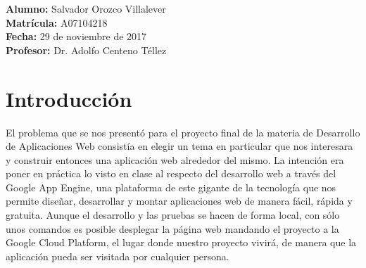 \documentclass[12pt]{article}
\begin{document}
\begin{titlepage}
    
    
    \textbf{Alumno:} Salvador Orozco Villalever\\
    \textbf{Matrícula:} A07104218\\
    \textbf{Fecha:} 29 de noviembre de 2017\\
    \textbf{Profesor:} Dr. Adolfo Centeno Téllez\\
    
    
    
\end{titlepage}

\renewcommand{\contentsname}{Contenido}
\tableofcontents
\pagebreak






\section{Introducción}

El problema que se nos presentó para el proyecto final de la materia de Desarrollo de Aplicaciones Web consistía en elegir un tema en particular que nos interesara y construir entonces una aplicación web alrededor del mismo. La intención era poner en práctica lo visto en clase al respecto del desarrollo web a través del Google App Engine, una plataforma de este gigante de la tecnología que nos permite diseñar, desarrollar y montar aplicaciones web de manera fácil, rápida y gratuita. Aunque el desarrollo y las pruebas se hacen de forma local, con sólo unos comandos es posible desplegar la página web mandando el proyecto a la Google Cloud Platform, el lugar donde nuestro proyecto vivirá, de manera que la aplicación pueda ser visitada por cualquier persona.
\end{document}
